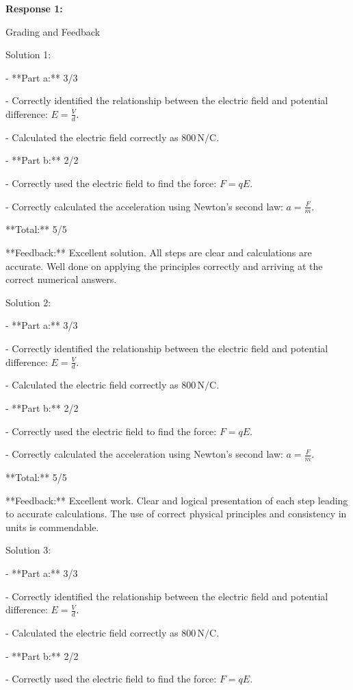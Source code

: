 \documentclass[a4paper,11pt]{article}
\begin{document}
\textbf{Response 1:}

Grading and Feedback

Solution 1:

- **Part a:** 3/3

  - Correctly identified the relationship between the electric field and potential difference: \( E = \frac{V}{d} \).
  
  - Calculated the electric field correctly as \( 800 \, \text{N/C} \).

- **Part b:** 2/2

  - Correctly used the electric field to find the force: \( F = qE \).
  
  - Correctly calculated the acceleration using Newton's second law: \( a = \frac{F}{m} \).

**Total:** 5/5

**Feedback:** Excellent solution. All steps are clear and calculations are accurate. Well done on applying the principles correctly and arriving at the correct numerical answers.

Solution 2:

- **Part a:** 3/3

  - Correctly identified the relationship between the electric field and potential difference: \( E = \frac{V}{d} \).
  
  - Calculated the electric field correctly as \( 800 \, \text{N/C} \).

- **Part b:** 2/2

  - Correctly used the electric field to find the force: \( F = qE \).
  
  - Correctly calculated the acceleration using Newton's second law: \( a = \frac{F}{m} \).

**Total:** 5/5

**Feedback:** Excellent work. Clear and logical presentation of each step leading to accurate calculations. The use of correct physical principles and consistency in units is commendable.

Solution 3:

- **Part a:** 3/3

  - Correctly identified the relationship between the electric field and potential difference: \( E = \frac{V}{d} \).
  
  - Calculated the electric field correctly as \( 800 \, \text{N/C} \).

- **Part b:** 2/2

  - Correctly used the electric field to find the force: \( F = qE \).
  
\end{document}
